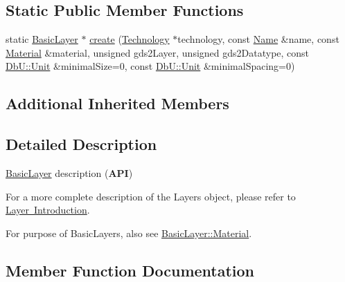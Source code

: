 \subsection*{Static Public Member Functions}
\begin{DoxyCompactItemize}
\item 
static \mbox{\hyperlink{classHurricane_1_1BasicLayer}{Basic\+Layer}} $\ast$ \mbox{\hyperlink{classHurricane_1_1BasicLayer_a76ccb64abaaf9c834c8ee8f010d5d24f}{create}} (\mbox{\hyperlink{classHurricane_1_1Technology}{Technology}} $\ast$technology, const \mbox{\hyperlink{classHurricane_1_1Name}{Name}} \&name, const \mbox{\hyperlink{classHurricane_1_1BasicLayer_1_1Material}{Material}} \&material, unsigned gds2\+Layer, unsigned gds2\+Datatype, const \mbox{\hyperlink{group__DbUGroup_ga4fbfa3e8c89347af76c9628ea06c4146}{Db\+U\+::\+Unit}} \&minimal\+Size=0, const \mbox{\hyperlink{group__DbUGroup_ga4fbfa3e8c89347af76c9628ea06c4146}{Db\+U\+::\+Unit}} \&minimal\+Spacing=0)
\end{DoxyCompactItemize}
\subsection*{Additional Inherited Members}


\subsection{Detailed Description}
\mbox{\hyperlink{classHurricane_1_1BasicLayer}{Basic\+Layer}} description ({\bfseries A\+PI}) 

For a more complete description of the Layers object, please refer to \mbox{\hyperlink{classHurricane_1_1Layer_secLayerIntro}{Layer Introduction}}.

For purpose of Basic\+Layers, also see \mbox{\hyperlink{classHurricane_1_1BasicLayer_1_1Material}{Basic\+Layer\+::\+Material}}. 

\subsection{Member Function Documentation}
\mbox{\label{classHurricane_1_1BasicLayer_a76ccb64abaaf9c834c8ee8f010d5d24f}} 
